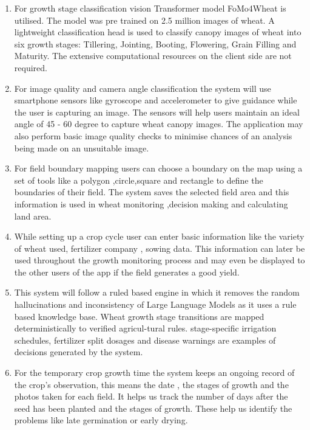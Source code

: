 \documentclass{FastFyp}
\begin{document}
\begin{enumerate}
    \item For growth stage classification vision Transformer model FoMo4Wheat is utilised. The model was pre trained on 2.5 million images of wheat. A lightweight classification head is used to classify canopy images of wheat into six growth stages: Tillering, Jointing, Booting, Flowering, Grain Filling and Maturity. The extensive computational resources on the client side are not required.

    \item For image quality and camera angle classification the system will use smartphone sensors like gyroscope and accelerometer to give guidance while the user is capturing an image. The sensors will help users maintain an ideal angle of 45 - 60 degree to capture wheat canopy images. The application may also perform basic image quality checks to minimise chances of an analysis being made on an unsuitable image.

    \item For field boundary mapping users can choose a boundary on the map using a set of tools like a polygon ,circle,square and rectangle to define the boundaries of their field. The system saves the selected field area and this information is used in wheat monitoring ,decision making and calculating land area.

    \item While setting up a crop cycle user can enter basic information like the variety of wheat used, fertilizer company , sowing data. This information can later be used throughout the growth monitoring process and may even be displayed to the other users of the app if the field generates a good yield.

    \item This system will follow a ruled based engine in which it  removes the random hallucinations and inconsistency of Large Language Models as it uses a rule based knowledge base. Wheat growth stage transitions are mapped deterministically to verified agricul-tural rules. stage-specific irrigation schedules, fertilizer split dosages and disease warnings are examples of decisions generated by the system.

    \item For the temporary crop growth time the system keeps an ongoing record of the crop's observation, this means the date , the stages of growth and the photos taken for each field. It helps us track the number of days after the seed has been planted and the stages of growth. These help us identify the problems like late germination or early drying.


\end{enumerate}
\end{document}
